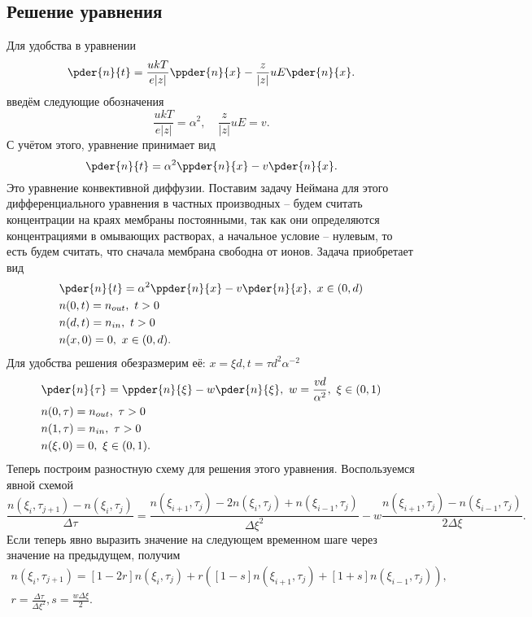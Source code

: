 \documentclass{hedwork}
\begin{document}
\subsection{Решение уравнения}
    Для удобства в уравнении
    \[
        \pder{n}{t} = \frac{ukT}{e|z|}\ppder{n}{x} -
            \frac{z}{|z|}uE\pder{n}{x}.
    \]
    введём следующие обозначения
    \[
        \frac{ukT}{e|z|} = \alpha^2,\quad \frac{z}{|z|}uE = v.
    \]
    С учётом этого, уравнение принимает вид
    \[
        \pder{n}{t} = \alpha^2\ppder{n}{x} - v\pder{n}{x}.
    \]
    Это уравнение конвективной диффузии. Поставим задачу Неймана для
    этого дифференциального уравнения в частных производных -- будем
    считать концентрации на краях мембраны постоянными, так как они
    определяются концентрациями в омывающих растворах, а начальное
    условие -- нулевым, то есть будем считать, что сначала мембрана
    свободна от ионов. Задача приобретает вид
    \begin{align*}
        & \pder{n}{t} = \alpha^2\ppder{n}{x} - v\pder{n}{x},\ x\in(0,d)\\
        & n(0, t) = n_{out},\ t>0 \\
        & n(d, t) = n_{in},\ t>0 \\
        & n(x, 0) = 0,\ x\in(0,d).
    \end{align*}
    Для удобства решения обезразмерим её:
    \( x = \xi d, t = \tau d^2 \alpha^{-2} \)
    \begin{align*}
        & \pder{n}{\tau} = \ppder{n}{\xi} -
            w\pder{n}{\xi},\ w = \frac{vd}{\alpha^2},\ \xi\in(0,1) \\
        & n(0, \tau) = n_{out},\ \tau>0 \\
        & n(1, \tau) = n_{in},\ \tau>0 \\
        & n(\xi, 0) = 0,\ \xi\in(0,1).
    \end{align*}
    Теперь построим разностную схему для решения этого уравнения.
    Воспользуемся явной схемой
    \[
        \frac{n(\xi_i,\tau_{j+1}) - n(\xi_i, \tau_j)}{\Delta\tau} =
        \frac{n(\xi_{i+1},\tau_j) - 2n(\xi_i, \tau_j) +
        n(\xi_{i-1},\tau_j)}{\Delta\xi^2} -
        w\frac{n(\xi_{i+1},\tau_j) - n(\xi_{i-1}, \tau_j)}{2\Delta\xi}.
    \]
    Если теперь явно выразить значение на следующем временном шаге через
    значение на предыдущем, получим
    \begin{gather*}
        n(\xi_i,\tau_{j+1}) =
        [1-2r]n(\xi_i, \tau_j) +
        r\left(
            [1 - s]n(\xi_{i+1},\tau_j) + [1 + s]n(\xi_{i-1},\tau_j)
        \right),\\
        r = \frac{\Delta\tau}{\Delta\xi^2}, s = \frac{w\Delta\xi}{2}.
    \end{gather*}
\end{document}
